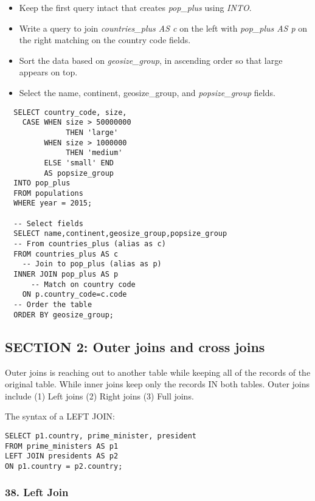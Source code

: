 \documentclass[
]{article}
\providecommand{\tightlist}{%
  \setlength{\itemsep}{0pt}\setlength{\parskip}{0pt}}
\begin{document}
\begin{itemize}
\tightlist
\item
  Keep the first query intact that creates \emph{pop\_plus} using
  \emph{INTO}.
\item
  Write a query to join \emph{countries\_plus AS c} on the left with
  \emph{pop\_plus AS p} on the right matching on the country code
  fields.
\item
  Sort the data based on \emph{geosize\_group}, in ascending order so
  that large appears on top.
\item
  Select the name, continent, geosize\_group, and \emph{popsize\_group}
  fields.
\end{itemize}

\begin{verbatim}
  SELECT country_code, size,
    CASE WHEN size > 50000000
              THEN 'large'
         WHEN size > 1000000
              THEN 'medium'
         ELSE 'small' END
         AS popsize_group
  INTO pop_plus       
  FROM populations
  WHERE year = 2015;
  
  -- Select fields
  SELECT name,continent,geosize_group,popsize_group
  -- From countries_plus (alias as c)
  FROM countries_plus AS c
    -- Join to pop_plus (alias as p)
  INNER JOIN pop_plus AS p
      -- Match on country code
    ON p.country_code=c.code
  -- Order the table    
  ORDER BY geosize_group;
\end{verbatim}

\hypertarget{section-2-outer-joins-and-cross-joins}{%
\subsection{SECTION 2: Outer joins and cross
joins}\label{section-2-outer-joins-and-cross-joins}}

Outer joins is reaching out to another table while keeping all of the
records of the original table. While inner joins keep only the records
IN both tables. Outer joins include (1) Left joins (2) Right joins (3)
Full joins.

The syntax of a LEFT JOIN:

\begin{verbatim}
SELECT p1.country, prime_minister, president
FROM prime_ministers AS p1
LEFT JOIN presidents AS p2
ON p1.country = p2.country;
\end{verbatim}

\hypertarget{left-join}{%
\subsubsection{38. Left Join}\label{left-join}}
\end{document}
